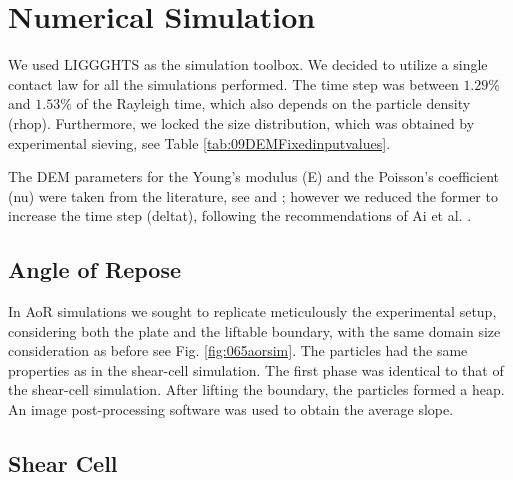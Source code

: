 
\chapter{Numerical Simulation}
\label{cap:numericalsimulation}


We used \acs{LIGGGHTS} as the simulation toolbox.
We decided to utilize a single
contact law for all the simulations performed.
The time step was between $1.29 \%$ and $1.53 \%$ of the Rayleigh time, which
also depends on the particle density (\acs{rhop}).
Furthermore, we locked the size distribution, which was obtained by experimental
sieving, see Table \ref{tab:09DEMFixedinputvalues}.

The \acs{DEM} parameters for the Young's modulus (\acs{E}) and the Poisson's coefficient
(\acs{nu}) were taken from the literature, see \cite{RefWorks:175} 
and \cite{RefWorks:176}; however we reduced the former to increase the time step
(\acs{deltat}), following the recommendations of Ai et al. \cite{RefWorks:131}.


\section{Angle of Repose}
\label{sec:aorsim}

In \acs{AoR} simulations we sought to replicate meticulously the experimental setup, 
considering both the plate and the liftable boundary, with the same domain size consideration as before
see Fig. \ref{fig:065aorsim}. 
The particles had the same properties as in the shear-cell simulation. 
The first phase was identical to that of the shear-cell simulation. 
After lifting the boundary, the particles formed a heap.
An image post-processing software was used to obtain the average slope.


\section{Shear Cell}
\label{sec:scsimulation}

